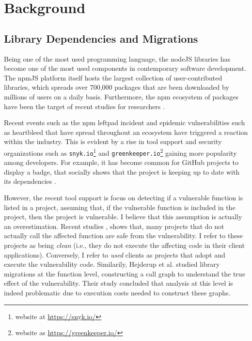 \chapter{Background}
\label{sec:background}
\section{Library Dependencies and Migrations}
Being one of the most used programming language, the nodeJS libraries has become one of the most used components in contemporary software development.
The npmJS platform itself hosts the largest collection of user-contributed libraries, which spreads over 700,000 packages that are been downloaded by millions of users on a daily basis. 
Furthermore, the npm ecosystem of packages have been the target of recent studies for researchers \cite{Wittern:2016,Kikas:2017,decan2018impact}.

Recent events such as the npm leftpad incident \cite{Web:left-pad} and epidemic vulnerabilities such as heartbleed \cite{Web:heartbleed} that have spread throughout an ecosystem have triggered a reaction within the industry.
This is evident by a rise in tool support and security organizations such as \texttt{snyk.io}\footnote{website at \url{https://snyk.io/}} and \texttt{greenkeeper.io}\footnote{website as \url{https://greenkeeper.io/}} gaining more popularity among developers.
For example, it has become common for GitHub projects to display a badge, that socially shows that the project is keeping up to date with its dependencies \cite{Trockman:2018,Mirhosseini:2017}.

However, the recent tool support is focus on detecting if a vulnerable function is listed in a project, assuming that, if the vulnerable function is included in the project, then the project is vulnerable. I believe that this assumption is actually an overestimation.
Recent studies \cite{Hejderup:2018}, \cite{Ponta:2018} shows that, many projects that do not actually call the affected function are safe from the vulnerability. I refer to these projects as being \textit{clean} (i.e., they do not execute the affecting code in their client applications).
Conversely, I refer to \textit{used} clients as projects that adopt and execute the vulnerability code.
Similarily, Hejderup et al. studied library migrations at the function level, constructing a call graph to understand the true effect of the vulnerability. 
Their study concluded that analysis at this level is indeed problematic due to execution costs needed to construct these graphs.

